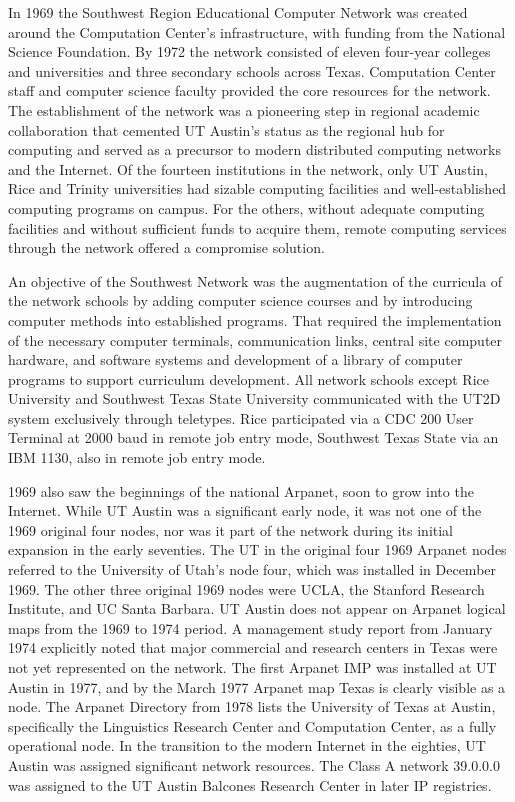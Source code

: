 In 1969 the Southwest Region Educational Computer Network was created around the Computation Center’s infrastructure, with funding from the National Science Foundation. By 1972 the network consisted of eleven four-year colleges and universities and three secondary schools across Texas. Computation Center staff and computer science faculty provided the core resources for the network. The establishment of the network was a pioneering step in regional academic collaboration that cemented UT Austin’s status as the regional hub for computing and served as a precursor to modern distributed computing networks and the Internet. Of the fourteen institutions in the network, only UT Austin, Rice and Trinity universities had sizable computing facilities and well-established computing programs on campus. For the others, without adequate computing facilities and without sufficient funds to acquire them, remote computing services through the network offered a compromise solution. \cite{RiceComputerIII1967} \cite{kayGaryKaySWTPC2005}

An objective of the Southwest Network was the augmentation of the curricula of the network schools by adding computer science courses and by introducing computer methods into established programs. That required the implementation of the necessary computer terminals, communication links, central site computer hardware, and software systems and development of a library of computer programs to support curriculum development. All network schools except Rice University and Southwest Texas State University communicated with the UT2D system exclusively through teletypes. Rice participated via a CDC 200 User Terminal at 2000 baud in remote job entry mode, Southwest Texas State via an IBM 1130, also in remote job entry mode. 

1969 also saw the beginnings of the national Arpanet, soon to grow into the Internet. While UT Austin was a significant early node, it was not one of the 1969 original four nodes, nor was it part of the network during its initial expansion in the early seventies. The UT in the original four 1969 Arpanet nodes referred to the University of Utah’s node four, which was installed in December 1969. The other three original 1969 nodes were UCLA, the Stanford Research Institute, and UC Santa Barbara. UT Austin does not appear on Arpanet logical maps from the 1969 to 1974 period. A management study report from January 1974 explicitly noted that major commercial and research centers in Texas were not yet represented on the network. The first Arpanet IMP was installed at UT Austin in 1977, and by the March 1977 Arpanet map Texas is clearly visible as a node. The Arpanet Directory from 1978 lists the University of Texas at Austin, specifically the Linguistics Research Center and Computation Center, as a fully operational node. In the transition to the modern Internet in the eighties, UT Austin was assigned significant network resources. The Class A network 39.0.0.0 was assigned to the UT Austin Balcones Research Center in later IP registries.

